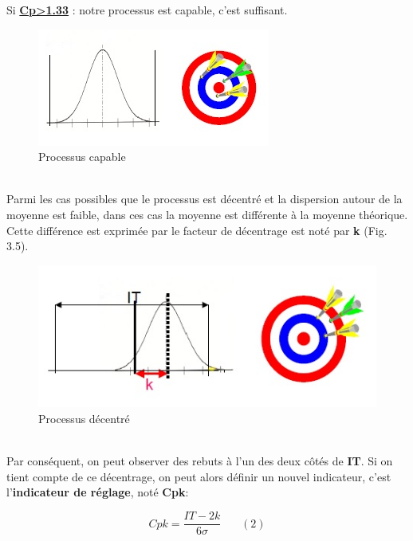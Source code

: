\documentclass[12pt, a4paper]{thesis}
\begin{document}
Si \textbf{\underline{Cp>1.33}} : notre processus est capable, c’est suffisant.\\
\begin{figure}[!h]
\begin{center}
        \includegraphics[scale=1]{capable.jpg}
        
        \caption{Processus capable}
\end{center}
\end{figure}\\
Parmi les cas possibles que le processus est décentré et la dispersion autour de la moyenne est faible, dans ces cas la moyenne est différente à la moyenne théorique. Cette différence est exprimée par le facteur de décentrage est noté par \textbf{k} (Fig. 3.5).\\
\begin{figure}[!h]
\begin{center}
        \includegraphics[scale=0.85]{centr.jpg}
        \caption{Processus décentré}
\end{center}
\end{figure}\\
Par conséquent, on peut observer des rebuts à l’un des deux côtés de \textbf{IT}. Si on tient compte de ce décentrage, on peut alors définir un nouvel indicateur, c’est l’\textbf{indicateur de réglage}, noté \textbf{Cpk}:

\[Cpk=\frac{IT - 2k}{6\sigma}  ~~~~~~~~  (2)\]  
\end{document}
